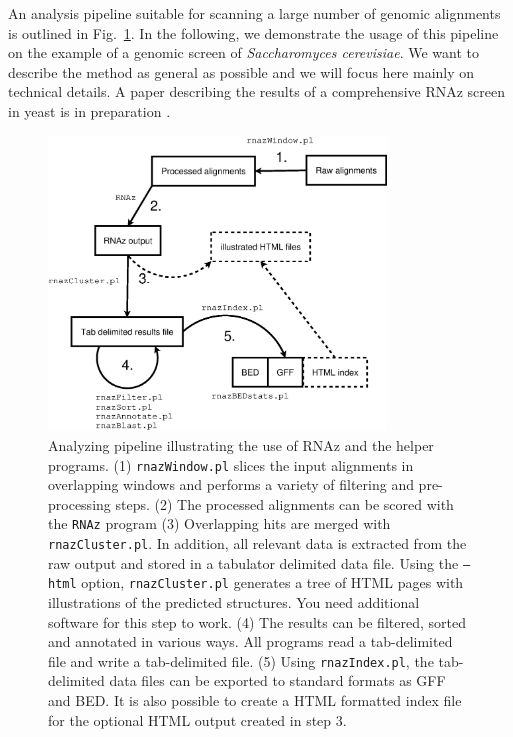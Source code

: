 \documentclass[11pt]{article}
\begin{document}
An analysis pipeline suitable for scanning a large number of genomic
alignments is outlined in Fig.~\ref{fig:pipeline}. In the following, we
demonstrate the usage of this pipeline on the example of a genomic screen
of \emph{Saccharomyces cerevisiae}. We want to describe the method as
general as possible and we will focus here mainly on technical details. A
paper describing the results of a comprehensive RNAz screen in yeast is in
preparation \cite{steigele06}.

\begin{figure}
  \centerline{\includegraphics*[width=0.8\textwidth]{figs/flowchart.eps}}

  \caption{Analyzing pipeline illustrating the use of RNAz and the helper
    programs.  (1) \texttt{rnazWindow.pl} slices the input alignments in
    overlapping windows and performs a variety of filtering and
    pre-processing steps. (2) The processed alignments can be scored with the
    \texttt{RNAz} program (3) Overlapping hits are merged with
    \texttt{rnazCluster.pl}. In addition, all relevant data is extracted from
    the raw output and stored in a tabulator delimited data file. Using the
    \texttt{--html} option, \texttt{rnazCluster.pl} generates a tree of HTML
    pages with illustrations of the predicted structures. You need additional
    software for this step to work. (4) The results can be filtered, sorted
    and annotated in various ways. All programs read a tab-delimited file and
    write a tab-delimited file. (5) Using \texttt{rnazIndex.pl}, the
    tab-delimited data files can be exported to standard formats as GFF and
    BED. It is also possible to create a HTML formatted index file for the
    optional HTML output created in step 3.}
\label{fig:pipeline}
\end{figure}
\end{document}
